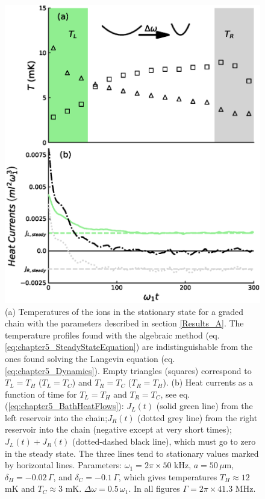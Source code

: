 \begin{figure}
  \center
  \includegraphics[width=0.85\linewidth]{Figures/24Mg_Temperature_Profiles_And_Evolution.eps}
  \caption{(a) Temperatures of the ions in the stationary state for a graded chain with the parameters described in section \ref{Results_A}. The temperature profiles found with the algebraic method (eq. \eqref{eq:chapter5_SteadyStateEquation}) are indistinguishable from the ones found solving the Langevin equation (eq. \eqref{eq:chapter5_Dynamics}). Empty triangles (squares) correspond to $T_L = T_H$ ($T_L = T_C$) and $T_R = T_C$ ($T_R = T_H$). (b) Heat currents  as a function of time for $T_L = T_H$ and $T_R = T_C$, see eq. (\ref{eq:chapter5_BathHeatFlows}): $J_L(t)$ (solid green line) from the left reservoir into the chain;$J_R(t)$ (dotted grey line) from the right reservoir into the chain (negative except at very short times); $J_L(t)+J_R(t)$ (dotted-dashed black line), which must go to zero in the steady state. The three lines tend to stationary values marked by horizontal lines. Parameters: $\omega_1 = 2\pi \times 50$ kHz, $a=50\, \mu$m,  $\delta_H = -0.02 \, \Gamma$, and $\delta_C = -0.1 \, \Gamma$, which gives temperatures $T_H \approx 12$ mK and $T_C \approx 3$ mK. $\Delta\omega = 0.5 \, \omega_1$. In all figures $\Gamma = 2\pi \times 41.3$ MHz.}
  \label{fig:Temperature_Profiles_Magnesium}
\end{figure}

